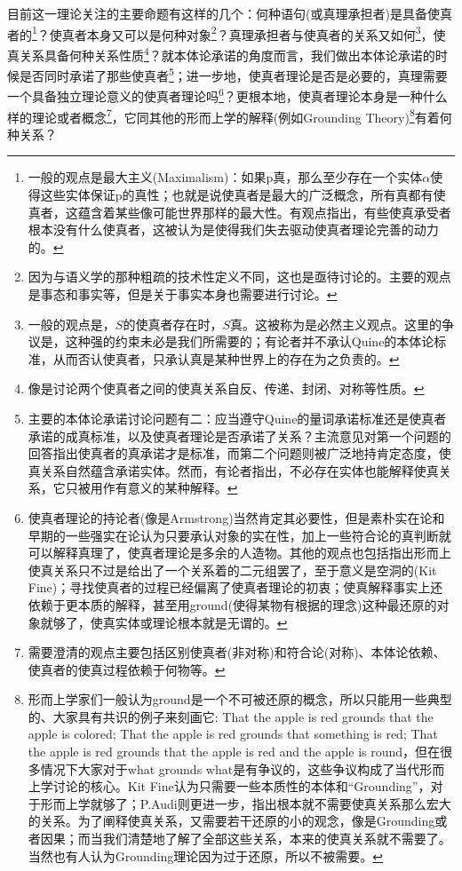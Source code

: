 \documentclass{article}
\begin{document}
目前这一理论关注的主要命题有这样的几个：何种语句(或真理承担者)是具备使真者的\footnote{一般的观点是最大主义(Maximalism)：如果p真，那么至少存在一个实体$\alpha$使得这些实体保证p的真性；也就是说使真者是最大的广泛概念，所有真都有使真者，这蕴含着某些像可能世界那样的最大性。有观点指出，有些使真承受者根本没有什么使真者，这被认为是使得我们失去驱动使真者理论完善的动力的。}？使真者本身又可以是何种对象\footnote{因为与语义学的那种粗疏的技术性定义不同，这也是亟待讨论的。主要的观点是事态和事实等，但是关于事实本身也需要进行讨论。}？真理承担者与使真者的关系又如何\footnote{一般的观点是，$S$的使真者存在时，$S$真。这被称为是必然主义观点。这里的争议是，这种强的约束未必是我们所需要的；有论者并不承认Quine的本体论标准，从而否认使真者，只承认真是某种世界上的存在为之负责的。}，使真关系具备何种关系性质\footnote{像是讨论两个使真者之间的使真关系自反、传递、封闭、对称等性质。}？就本体论承诺的角度而言，我们做出本体论承诺的时候是否同时承诺了那些使真者\footnote{主要的本体论承诺讨论问题有二：应当遵守Quine的量词承诺标准还是使真者承诺的成真标准，以及使真者理论是否承诺了关系？主流意见对第一个问题的回答指出使真者的真承诺才是标准，而第二个问题则被广泛地持肯定态度，使真关系自然蕴含承诺实体。然而，有论者指出，不必存在实体也能解释使真关系，它只被用作有意义的某种解释。}；进一步地，使真者理论是否是必要的，真理需要一个具备独立理论意义的使真者理论吗\footnote{使真者理论的持论者(像是Armstrong)当然肯定其必要性，但是素朴实在论和早期的一些强实在论认为只要承认对象的实在性，加上一些符合论的真判断就可以解释真理了，使真者理论是多余的人造物。其他的观点也包括指出形而上使真关系只不过是给出了一个关系着的二元组罢了，至于意义是空洞的(Kit Fine)；寻找使真者的过程已经偏离了使真者理论的初衷；使真解释事实上还依赖于更本质的解释，甚至用ground(使得某物有根据的理念)这种最还原的对象就够了，使真实体或理论根本就是无谓的。}？更根本地，使真者理论本身是一种什么样的理论或者概念\footnote{需要澄清的观点主要包括区别使真者(非对称)和符合论(对称)、本体论依赖、使真者的使真过程依赖于何物等。}，它同其他的形而上学的解释(例如Grounding Theory)\footnote{形而上学家们一般认为ground是一个不可被还原的概念，所以只能用一些典型的、大家具有共识的例子来刻画它: That the apple is red grounds that the apple is colored; That the apple is red grounds that something is red; That the apple is red grounds that the apple is red and the apple is round，但在很多情况下大家对于what grounds what是有争议的，这些争议构成了当代形而上学讨论的核心。Kit Fine认为只需要一些本质性的本体和“Grounding”，对于形而上学就够了；P.Audi则更进一步，指出根本就不需要使真关系那么宏大的关系。为了阐释使真关系，又需要若干还原的小的观念，像是Grounding或者因果；而当我们清楚地了解了全部这些关系，本来的使真关系就不需要了。当然也有人认为Grounding理论因为过于还原，所以不被需要。}有着何种关系？
\end{document}
